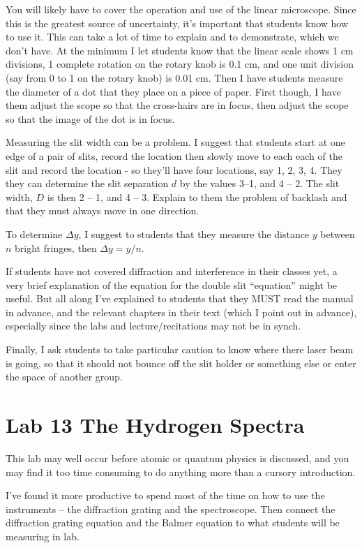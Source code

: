 You will likely have to cover the operation and use of the linear microscope. Since this is the greatest source of uncertainty, it's important that students know how to use it. This can take a lot of time to explain and to demonstrate, which we don't have. At the minimum I let students know that the linear scale shows 1 cm divisions, 1 complete rotation on the rotary knob is 0.1 cm, and one unit division (say from 0 to 1 on the rotary knob) is 0.01 cm. Then I have students measure the diameter of a dot that they place on a piece of paper. First though, I have them adjust the scope so that the cross-hairs are in focus, then adjust the scope so that the image of the dot is in focus.

Measuring the slit width can be a problem. I suggest that students start at one edge of a pair of slits, record the location then slowly move to each each of the slit and record the location - so they'll have four locations, say 1, 2, 3, 4. They they can determine the slit separation $d$ by the values 3--1, and 4 -- 2.  The slit width, $D$ is then 2 -- 1, and 4 -- 3. Explain to them the problem of backlash and that they must always move in one direction.

To determine $\Delta y$, I suggest to students that they measure  the distance $y$ between $n$ bright fringes, then $\Delta y = y/n$.

If students have not covered diffraction and interference in their classes yet, a very brief explanation of the equation for the double slit ``equation'' might be useful. But all along I've explained to students that they MUST read the manual in advance, and the relevant chapters in their text (which I point out in advance), especially since the labs and lecture/recitations may not be in synch. 

Finally, I ask students to take particular caution to know where there laser beam is going, so that it should not bounce off the slit holder or something else or enter the space of another group.

\section{Lab 13 The Hydrogen Spectra}
This lab may well occur before atomic or quantum physics is discussed, and you may find it too time consuming to do anything more than a cursory introduction.

I've found it more productive to spend most of the time on how to use the instruments -- the diffraction grating and the spectroscope. Then connect the diffraction grating equation and the Balmer equation to what students will be measuring in lab.

